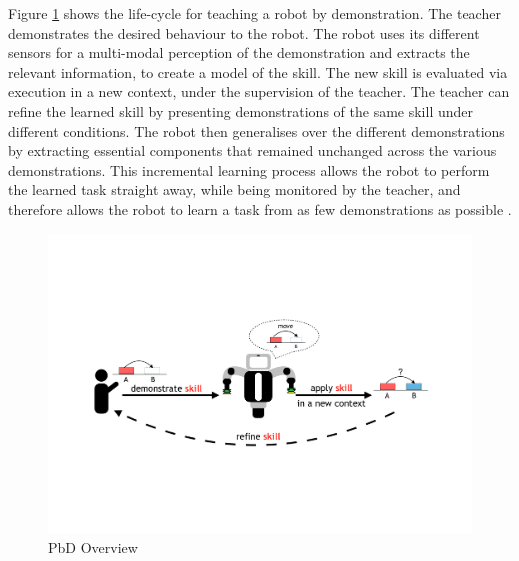 Figure \ref{fig:Principle Overview} shows the life-cycle for teaching a robot by demonstration. 
The teacher demonstrates the desired behaviour to the robot. The robot uses its different sensors for a multi-modal perception of the demonstration and extracts the relevant information, to create a model of the skill. The new skill is evaluated via execution in a new context, under the supervision of the teacher. The teacher can refine the learned skill by presenting demonstrations of the same skill under different conditions. The robot then generalises over the different demonstrations by extracting essential components that remained unchanged across the various demonstrations. This incremental learning process allows the robot to perform the learned task straight away, while being monitored by the teacher, and therefore allows the robot to learn a task from as few demonstrations as possible \cite{billard2008robot}. 

  \begin{figure}[h]
    \centering
    \includegraphics[scale=0.7]{figures/PbD-Overview}
    \caption{PbD Overview}
    \label{fig:Principle Overview}
  \end{figure}


